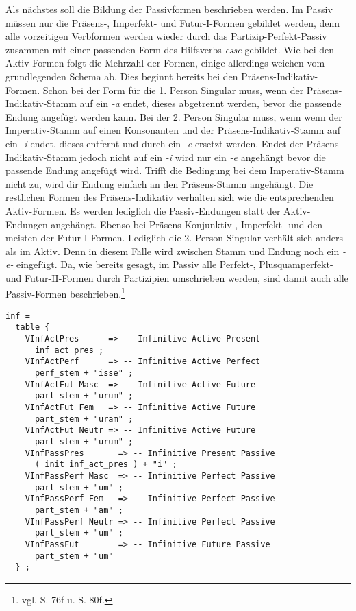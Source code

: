 Als nächstes soll die Bildung der Passivformen beschrieben werden. Im Passiv müssen nur die Präsens-, Imperfekt- und Futur-I-Formen gebildet werden, denn alle vorzeitigen Verbformen werden wieder durch das Partizip-Perfekt-Passiv zusammen mit einer passenden Form des Hilfsverbs \textit{esse} gebildet. Wie bei den Aktiv-Formen folgt die Mehrzahl der Formen, einige allerdings weichen vom grundlegenden Schema ab. Dies beginnt bereits bei den Präsens-Indikativ-Formen. Schon bei der Form für die 1. Person Singular muss, wenn der Präsens-Indikativ-Stamm auf ein \textit{-a} endet, dieses abgetrennt werden, bevor die passende Endung angefügt werden kann. Bei der 2. Person Singular muss, wenn wenn der Imperativ-Stamm auf einen Konsonanten und der Präsens-Indikativ-Stamm auf ein \textit{-i} endet, dieses entfernt und durch ein \textit{-e} ersetzt werden. Endet der Präsens-Indikativ-Stamm jedoch nicht auf ein \textit{-i} wird nur ein \textit{-e} angehängt bevor die passende Endung angefügt wird. Trifft die Bedingung bei dem Imperativ-Stamm nicht zu, wird dir Endung einfach an den Präsens-Stamm angehängt. Die restlichen Formen des Präsens-Indikativ verhalten sich wie die entsprechenden Aktiv-Formen. Es werden lediglich die Passiv-Endungen statt der Aktiv-Endungen angehängt. Ebenso bei Präsens-Konjunktiv-, Imperfekt- und den meisten der Futur-I-Formen. Lediglich die 2. Person Singular verhält sich anders als im Aktiv. Denn in diesem Falle wird zwischen Stamm und Endung noch ein \textit{-e-} eingefügt. Da, wie bereits gesagt, im Passiv alle Perfekt-, Plusquamperfekt- und Futur-II-Formen durch Partizipien umschrieben werden, sind damit auch alle Passiv-Formen beschrieben.\footnote{vgl. \cite{BAYER-LINDAUER1994} S. 76f u. S. 80f.} \par
\begin{lstlisting}[float=h!tp,caption={Ausschnitt aus der Funktion \texttt{mkVerb} um Infinitiv-Verbformen zu bilden (vgl. \textbf{ResLat.gf})},label={GF-Res-MkVerb-Inf},basicstyle=\small]
inf = 
  table {
    VInfActPres      => -- Infinitive Active Present
      inf_act_pres ;
    VInfActPerf _    => -- Infinitive Active Perfect
      perf_stem + "isse" ;
    VInfActFut Masc  => -- Infinitive Active Future
      part_stem + "urum" ;
    VInfActFut Fem   => -- Infinitive Active Future
      part_stem + "uram" ; 
    VInfActFut Neutr => -- Infinitive Active Future
      part_stem + "urum" ;
    VInfPassPres       => -- Infinitive Present Passive
      ( init inf_act_pres ) + "i" ;
    VInfPassPerf Masc  => -- Infinitive Perfect Passive
      part_stem + "um" ;
    VInfPassPerf Fem   => -- Infinitive Perfect Passive
      part_stem + "am" ;
    VInfPassPerf Neutr => -- Infinitive Perfect Passive
      part_stem + "um" ;
    VInfPassFut        => -- Infinitive Future Passive
      part_stem + "um"
  } ;
\end{lstlisting}

